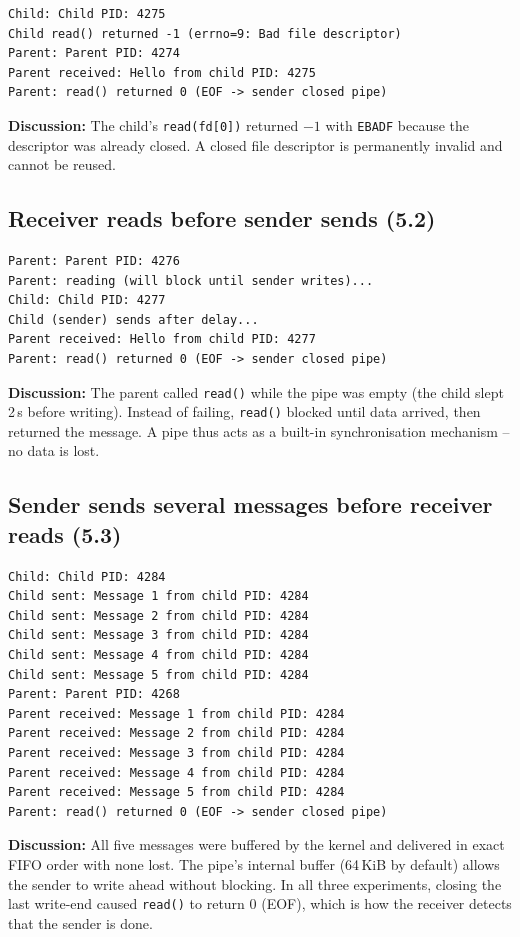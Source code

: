 \documentclass[11pt,a4paper]{article}
\begin{document}
\begin{lstlisting}[style=termstyle]
Child: Child PID: 4275
Child read() returned -1 (errno=9: Bad file descriptor)
Parent: Parent PID: 4274
Parent received: Hello from child PID: 4275
Parent: read() returned 0 (EOF -> sender closed pipe)
\end{lstlisting}

\noindent\textbf{Discussion:} The child's \texttt{read(fd[0])} returned $-1$ with \texttt{EBADF} because the descriptor was already closed. A closed file descriptor is permanently invalid and cannot be reused.

\subsection{Receiver reads before sender sends (5.2)}

\begin{lstlisting}[style=termstyle]
Parent: Parent PID: 4276
Parent: reading (will block until sender writes)...
Child: Child PID: 4277
Child (sender) sends after delay...
Parent received: Hello from child PID: 4277
Parent: read() returned 0 (EOF -> sender closed pipe)
\end{lstlisting}

\noindent\textbf{Discussion:} The parent called \texttt{read()} while the pipe was empty (the child slept 2\,s before writing). Instead of failing, \texttt{read()} blocked until data arrived, then returned the message. A pipe thus acts as a built-in synchronisation mechanism -- no data is lost.

\subsection{Sender sends several messages before receiver reads (5.3)}

\begin{lstlisting}[style=termstyle]
Child: Child PID: 4284
Child sent: Message 1 from child PID: 4284
Child sent: Message 2 from child PID: 4284
Child sent: Message 3 from child PID: 4284
Child sent: Message 4 from child PID: 4284
Child sent: Message 5 from child PID: 4284
Parent: Parent PID: 4268
Parent received: Message 1 from child PID: 4284
Parent received: Message 2 from child PID: 4284
Parent received: Message 3 from child PID: 4284
Parent received: Message 4 from child PID: 4284
Parent received: Message 5 from child PID: 4284
Parent: read() returned 0 (EOF -> sender closed pipe)
\end{lstlisting}

\noindent\textbf{Discussion:} All five messages were buffered by the kernel and delivered in exact FIFO order with none lost. The pipe's internal buffer (64\,KiB by default) allows the sender to write ahead without blocking. In all three experiments, closing the last write-end caused \texttt{read()} to return 0 (EOF), which is how the receiver detects that the sender is done.
\end{document}
